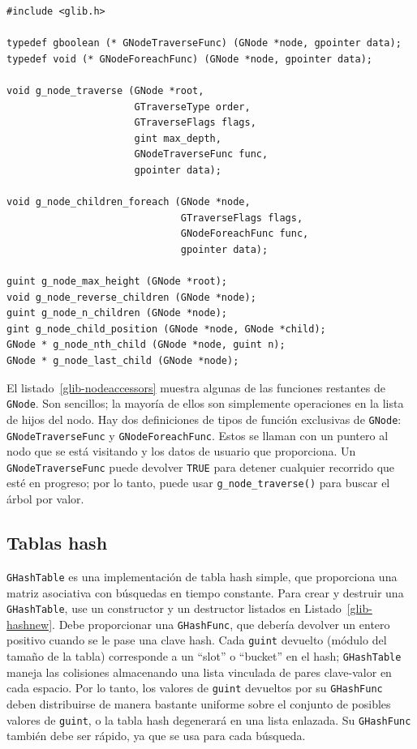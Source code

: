 \begin{lstlisting}[float, caption={Accessing a \lstinline{GNode}}, label=glib-nodeaccessors]
#include <glib.h>

typedef gboolean (* GNodeTraverseFunc) (GNode *node, gpointer data);
typedef void (* GNodeForeachFunc) (GNode *node, gpointer data);

void g_node_traverse (GNode *root,
                      GTraverseType order,
                      GTraverseFlags flags,
                      gint max_depth,
                      GNodeTraverseFunc func,
                      gpointer data);

void g_node_children_foreach (GNode *node,
                              GTraverseFlags flags,
                              GNodeForeachFunc func,
                              gpointer data);

guint g_node_max_height (GNode *root);
void g_node_reverse_children (GNode *node);
guint g_node_n_children (GNode *node);
gint g_node_child_position (GNode *node, GNode *child);
GNode * g_node_nth_child (GNode *node, guint n);
GNode * g_node_last_child (GNode *node);
\end{lstlisting}

El listado~\ref{glib-nodeaccessors} muestra algunas de las funciones restantes de \lstinline{GNode}. Son sencillos; la mayoría de ellos son simplemente operaciones en la lista de hijos del nodo. Hay dos definiciones de tipos de función exclusivas de \lstinline{GNode}: \lstinline{GNodeTraverseFunc} y \lstinline{GNodeForeachFunc}. Estos se llaman con un puntero al nodo que se está visitando y los datos de usuario que proporciona. Un \lstinline{GNodeTraverseFunc} puede devolver \lstinline{TRUE} para detener cualquier recorrido que esté en progreso; por lo tanto, puede usar \lstinline{g_node_traverse()} para buscar el árbol por valor.

\subsection{Tablas hash}

\lstinline{GHashTable} es una implementación de tabla hash simple, que proporciona una matriz asociativa con búsquedas en tiempo constante. Para crear y destruir una \lstinline{GHashTable}, use un constructor y un destructor listados en Listado~\ref{glib-hashnew}. Debe proporcionar una \lstinline{GHashFunc}, que debería devolver un entero positivo cuando se le pase una clave hash. Cada \lstinline{guint} devuelto (módulo del tamaño de la tabla) corresponde a un ``slot'' o ``bucket'' en el hash; \lstinline{GHashTable} maneja las colisiones almacenando una lista vinculada de pares clave-valor en cada espacio. Por lo tanto, los valores de \lstinline{guint} devueltos por su \lstinline{GHashFunc} deben distribuirse de manera bastante uniforme sobre el conjunto de posibles valores de \lstinline{guint}, o la tabla hash degenerará en una lista enlazada. Su \lstinline{GHashFunc} también debe ser rápido, ya que se usa para cada búsqueda.

